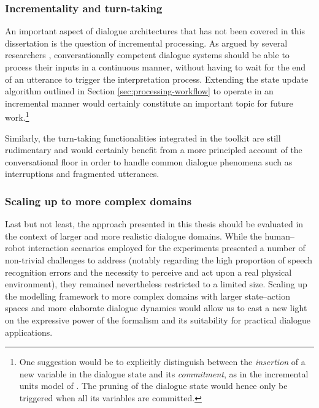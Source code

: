 \subsubsection*{Incrementality and turn-taking}

An important aspect of dialogue architectures that has not been covered in this dissertation is the question of incremental processing. As argued by several researchers \citep[see for instance][]{schlangen2009general}, conversationally competent dialogue systems should be able to process their inputs in a continuous manner, without having to wait for the end of an utterance to trigger the interpretation process.  Extending the state update algorithm outlined in Section \ref{sec:processing-workflow} to operate in an incremental manner would certainly constitute an important topic for future work.\footnote{One suggestion would be to explicitly distinguish between the \textit{insertion} of a new variable in the dialogue state and its \textit{commitment}, as in the incremental units model of \cite{schlangen2009general}.  The pruning of the dialogue state would hence only be triggered when all its variables are committed.}

Similarly, the turn-taking  functionalities integrated in the \opendial{} toolkit are still rudimentary and would certainly benefit from a more principled account of the conversational floor in order to handle common dialogue phenomena such as interruptions and fragmented utterances. 

\subsubsection*{Scaling up to more complex domains}

Last but not least, the approach presented in this thesis should be evaluated in the context of larger and more realistic dialogue domains. While the human--robot interaction scenarios employed for the experiments presented a number of non-trivial challenges to address (notably regarding the high proportion of speech recognition errors and the necessity to perceive and act upon a real physical environment), they remained nevertheless restricted to a limited size. Scaling up the modelling framework to more complex domains with larger state--action spaces and more elaborate dialogue dynamics would allow us to cast a new light on the expressive power of the formalism and its suitability for practical dialogue applications. 

